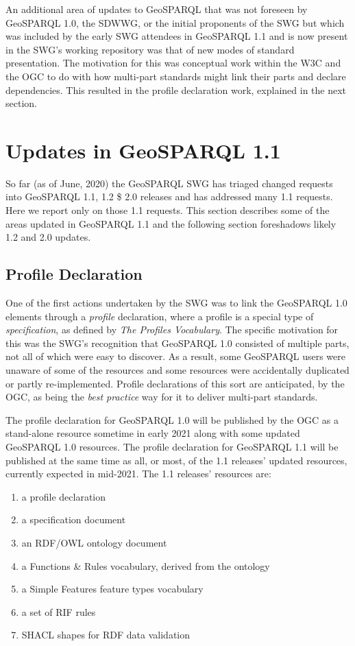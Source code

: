 \documentclass[runningheads]{llncs}
\begin{document}
An additional area of updates to GeoSPARQL that was not foreseen by GeoSPARQL 1.0, the SDWWG, or the initial proponents of the SWG
but which was included by the early SWG attendees in GeoSPARQL 1.1 and is now present in the SWG's working repository was that 
of new modes of standard presentation. The motivation for this was conceptual work within the W3C and the OGC to do with how 
multi-part standards might link their parts and declare dependencies. This resulted in the profile declaration work, explained 
in the next section.


\section{Updates in GeoSPARQL 1.1}\label{sec:newfeatures}
So far (as of June, 2020) the GeoSPARQL SWG has triaged changed requests into GeoSPARQL 1.1, 1.2 \$ 2.0 releases and has addressed
many 1.1 requests. Here we report only on those 1.1 requests. This section describes some of the areas updated in GeoSPARQL 1.1
and the following section foreshadows likely 1.2 and 2.0 updates.

\subsection{Profile Declaration}\label{sec:profiledec}
One of the first actions undertaken by the SWG was to link the GeoSPARQL 1.0 elements through a \textit{profile} 
declaration, where a profile is a special type of \textit{specification}, as defined by \textit{The Profiles Vocabulary}\cite{atkinson_profiles_2020}. 
The specific motivation for this was the SWG's recognition that GeoSPARQL 1.0 consisted of multiple parts, not all
of which were easy to discover. As a result, some GeoSPARQL users were unaware of some of the resources and some
resources were accidentally duplicated or partly re-implemented. Profile declarations of this sort are anticipated, by the OGC, 
as being the \textit{best practice} way for it to deliver multi-part standards.

The profile declaration for GeoSPARQL 1.0 will be published by the OGC as a stand-alone resource sometime in early 2021 along with some 
updated GeoSPARQL 1.0 resources. The profile declaration for GeoSPARQL 1.1 will be published at the same time as all, or most, of the 
1.1 releases' updated resources, currently expected in mid-2021. The 1.1 releases' resources are:

\begin{enumerate}
    \item a profile declaration
    \item a specification document
    \item an RDF/OWL ontology document
    \item a Functions \& Rules vocabulary, derived from the ontology
    \item a Simple Features feature types vocabulary
    \item a set of RIF\cite{kifer2013rif} rules
    \item SHACL\cite{knublauch_shapes_2017} shapes for RDF data validation 
\end{enumerate}
\end{document}
